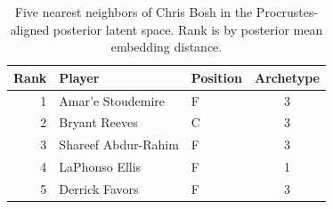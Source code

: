 \begin{table}[htbp]
  \centering\small
  \begin{tabular}{rllc}
    \toprule
    Rank & Player & Position & Archetype \\
    \midrule
    1 & Amar'e Stoudemire & F & 3 \\
    2 & Bryant Reeves & C & 3 \\
    3 & Shareef Abdur-Rahim & F & 3 \\
    4 & LaPhonso Ellis & F & 1 \\
    5 & Derrick Favors & F & 3 \\
    \bottomrule
  \end{tabular}
  \caption{Five nearest neighbors of Chris Bosh in the Procrustes-aligned posterior latent space. Rank is by posterior mean embedding distance.}
  \label{tab:Chris_Bosh_neighbors}
\end{table}


